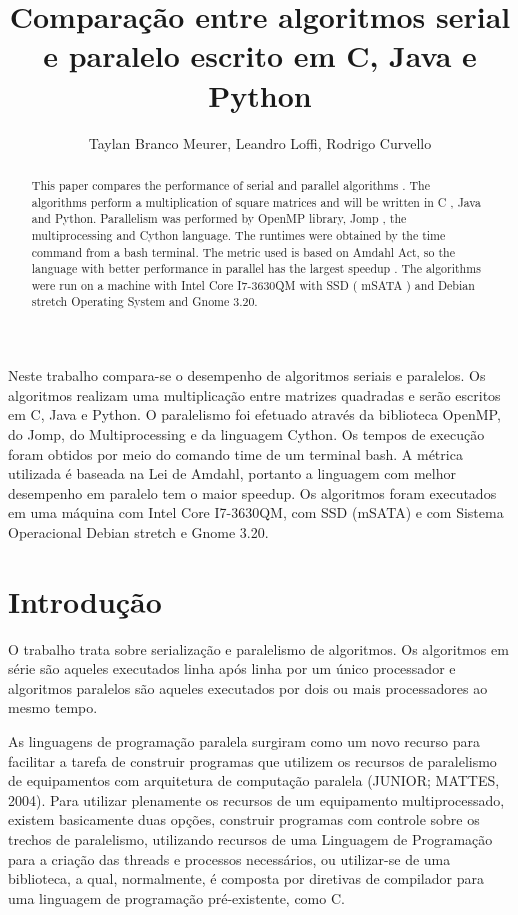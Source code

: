 \documentclass[a4paper,12pt]{article}
\title{Comparação entre algoritmos serial e paralelo escrito em C, Java e Python\\}
\author{Taylan Branco Meurer\inst{1}, Leandro Loffi\inst{1}, Rodrigo Curvello\inst{2}}
\begin{document}
 

\maketitle

\begin{abstract}
This paper compares the performance of serial and parallel algorithms . The algorithms perform a multiplication of square matrices and will be written in C , Java and Python. Parallelism was performed by OpenMP library, Jomp , the multiprocessing and Cython language. The runtimes were obtained by the time command from a bash terminal. The metric used is based on Amdahl Act, so the language with better performance in parallel has the largest speedup . The algorithms were run on a machine with Intel Core I7-3630QM with SSD ( mSATA ) and Debian stretch Operating System and Gnome 3.20. 
\end{abstract}

\begin{resumo}
Neste trabalho compara-se o desempenho de algoritmos seriais e paralelos. Os algoritmos realizam uma multiplicação entre matrizes quadradas e serão escritos em C, Java e Python. O paralelismo foi efetuado através da biblioteca OpenMP, do Jomp, do Multiprocessing e da linguagem Cython. Os tempos de execução foram obtidos por meio do comando time de um terminal bash. A métrica utilizada é baseada na Lei de Amdahl, portanto a linguagem com melhor desempenho em paralelo tem o maior speedup. Os algoritmos foram executados em uma máquina com Intel Core I7-3630QM, com SSD (mSATA) e com Sistema Operacional Debian stretch e Gnome 3.20.
\end{resumo}
\section{Introdução}

O trabalho trata sobre serialização e paralelismo de algoritmos. Os algoritmos em série são aqueles executados linha após linha por um único processador e algoritmos paralelos são aqueles executados por dois ou mais processadores ao mesmo tempo. 

	As linguagens de programação paralela surgiram como um novo recurso para facilitar a tarefa de construir programas que utilizem os recursos de paralelismo de equipamentos com arquitetura de computação paralela (JUNIOR; MATTES, 2004). Para utilizar plenamente os recursos de um equipamento multiprocessado, existem basicamente duas opções, construir programas com controle sobre os trechos de paralelismo, utilizando recursos de uma Linguagem de Programação para a criação das threads e processos necessários, ou utilizar-se de uma biblioteca, a qual, normalmente, é composta por diretivas de compilador para uma linguagem de programação pré-existente, como C.
	 
\end{document}
